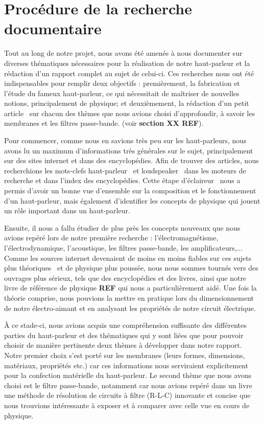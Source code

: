 
\section{Procédure de la recherche documentaire} 

Tout au long de notre projet, nous avons été amenés à nous documenter sur diverses thématiques nécessaires pour la réalisation de notre haut-parleur et la rédaction d'un rapport complet au sujet de celui-ci.
Ces recherches nous ont été indispensables pour remplir deux objectifs : premièrement, la fabrication et l'étude du fameux haut-parleur, ce qui nécessitait de maîtriser de nouvelles notions, principalement de physique; et deuxièmement, la rédaction d'un petit \og article \fg\ sur chacun des thèmes que nous avions choisi d'approfondir, à savoir les membranes et les filtres passe-bande. (voir \textbf{section XX REF}). %
\newline

Pour commencer, comme nous en savions très peu sur les haut-parleurs, nous avons lu un maximum d’informations très générales sur le sujet, principalement sur des sites internet et dans des encyclopédies. Afin de trouver des articles, nous recherchions les mots-clefs \og haut-parleur \fg\ et \og loudspeaker \fg\ dans les moteurs de recherche et dans l'index des encyclopédies. 
Cette étape \og d'éclaireur \fg\ nous a permis d'avoir un bonne vue d’ensemble sur la composition et le fonctionnement d’un haut-parleur, mais également d'identifier les concepts de physique qui jouent un rôle important dans un haut-parleur.  


Ensuite, il nous a fallu étudier de plus près les concepts nouveaux que nous avions repéré lors de notre première recherche : l'électromagnétisme, l'électrodynamique, l’acoustique, les filtres passe-bande, les amplificateurs,... Comme les sources internet devenaient de moins en moins fiables sur ces sujets plus \og théoriques \fg\ et de physique plus poussée, nous nous sommes tournés vers des ouvrages plus sérieux, tels que des encyclopédies et des livres, ainsi que notre livre de référence de physique \textbf{REF} %
qui nous a particulièrement aidé. Une fois la théorie comprise, nous pouvions la mettre en pratique lors du dimensionnement de notre électro-aimant et en analysant les propriétés de notre circuit électrique. 
\newline

À ce stade-ci, nous avions acquis une compréhension suffisante des différentes parties du haut-parleur et des thématiques qui y sont liées que pour pouvoir choisir de manière pertinente deux thèmes à développer dans notre rapport. Notre premier choix s'est  porté sur les membranes (leurs formes, dimensions, matériaux, propriétés etc.) car ces informations nous serviraient explicitement pour la confection matérielle du haut-parleur. Le second thème que nous avons choisi est le filtre passe-bande, notamment car nous avions repéré dans un livre une méthode de résolution de circuits à filtre (R-L-C) innovante et concise que nous trouvions intéressante à exposer et à comparer avec celle vue en cours de physique. 

